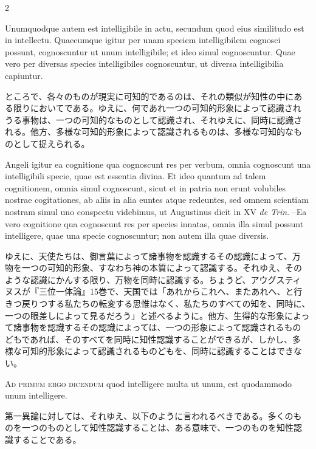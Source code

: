 \documentclass[paper=a4paper,fontsize=10pt,jafontsize=9pt,titlepage]{jlreq}
\begin{document}
\begin{paracol}{2}
\switchcolumn*

Unumquodque
autem est intelligibile in actu, secundum quod eius similitudo est in
intellectu. Quaecumque igitur per unam speciem intelligibilem cognosci
possunt, cognoscuntur ut unum intelligibile; et ideo simul
cognoscuntur. Quae vero per diversas species intelligibiles
cognoscuntur, ut diversa intelligibilia capiuntur.

\switchcolumn

ところで、各々のものが現実に可知的であるのは、それの類似が知性の中にあ
る限りにおいてである。ゆえに、何であれ一つの可知的形象によって認識され
うる事物は、一つの可知的なものとして認識され、それゆえに、同時に認識さ
れる。他方、多様な可知的形象によって認識されるものは、多様な可知的なも
のとして捉えられる。

\switchcolumn*

Angeli igitur ea cognitione qua cognoscunt res per verbum, omnia
cognoscunt una intelligibili specie, quae est essentia divina. Et ideo
quantum ad talem cognitionem, omnia simul cognoscunt, sicut et in
patria non erunt volubiles nostrae cogitationes, ab aliis in alia
euntes atque redeuntes, sed omnem scientiam nostram simul uno
conspectu videbimus, ut Augustinus dicit in XV {\itshape de
Trin}. --Ea vero cognitione qua cognoscunt res per species innatas,
omnia illa simul possunt intelligere, quae una specie cognoscuntur;
non autem illa quae diversis.

\switchcolumn

ゆえに、天使たちは、御言葉によって諸事物を認識するその認識によって、万
物を一つの可知的形象、すなわち神の本質によって認識する。それゆえ、その
ような認識にかんする限り、万物を同時に認識する。ちょうど、アウグスティ
ヌスが『三位一体論』15巻で、天国では「あれからこれへ、またあれへ、と行
きつ戻りつする私たちの転変する思惟はなく、私たちのすべての知を、同時に、
一つの眼差しによって見るだろう」と述べるように。他方、生得的な形象によっ
て諸事物を認識するその認識によっては、一つの形象によって認識されるもの
どもであれば、そのすべてを同時に知性認識することができるが、しかし、多
様な可知的形象によって認識されるものどもを、同時に認識することはできな
い。

\switchcolumn*

{\scshape Ad primum ergo dicendum} quod intelligere multa ut unum, est
quodammodo unum intelligere.

\switchcolumn

第一異論に対しては、それゆえ、以下のように言われるべきである。多くのも
のを一つのものとして知性認識することは、ある意味で、一つのものを知性認
識することである。


\end{paracol}
\end{document}
